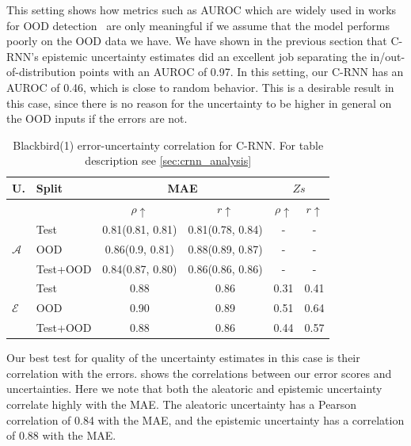 This setting shows how metrics such as AUROC which are widely used in works for OOD detection~\citep{liang2017enhancing, hein2019relu, lee2017training} are only meaningful if we assume that the model performs poorly on the OOD data we have. We have shown in the previous section that C-RNN's epistemic uncertainty estimates did an excellent job separating the in/out-of-distribution points with an AUROC of 0.97. In this setting, our C-RNN has an AUROC of 0.46, which is close to random behavior. This is a desirable result in this case, since there is no reason for the uncertainty to be higher in general on the OOD inputs if the errors are not.


\begin{table}[h]
\centering
    \begin{tabular}{l l c c c c}  
        \toprule
        U. & Split & \multicolumn{2}{c}{MAE} & \multicolumn{2}{c}{$Zs$}\\
        \midrule
        & & $\rho \uparrow$ & $r \uparrow$ & $\rho \uparrow$ & $r \uparrow$ \\
        \multirow{3}{*}{$\mathcal{A}$} 
            & Test     & 0.81(0.81, 0.81) & 0.81(0.78, 0.84) & - & - \\  
            & OOD      & 0.86(0.9, 0.81) & 0.88(0.89, 0.87) & - & - \\  
            & Test+OOD & 0.84(0.87, 0.80) & 0.86(0.86, 0.86) & - & - \\ 

        \midrule
        \multirow{3}{*}{$\mathcal{E}$} 
            & Test     & 0.88  & 0.86 &  0.31  & 0.41 \\  
            & OOD      & 0.90 & 0.89 &  0.51 & 0.64 \\
            & Test+OOD & 0.88 & 0.86 &  0.44 & 0.57 \\ 

        \toprule
    \end{tabular}
    \caption[Blackbird(1) error-uncertainty correlation for C-RNN]{Blackbird(1) error-uncertainty correlation for C-RNN. For table description see \cref{sec:crnn_analysis}}
    \label{tbl:bb1_corr}
\end{table}

Our best test for quality of the uncertainty estimates in this case is their correlation with the errors.  shows the correlations between our error scores and uncertainties.  Here we note that both the aleatoric and epistemic uncertainty correlate highly with the MAE. The aleatoric uncertainty has a Pearson correlation of 0.84 with the MAE, and the epistemic uncertainty has a correlation of 0.88 with the MAE. 

